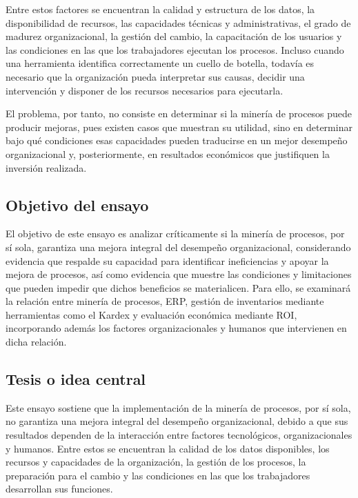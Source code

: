 \documentclass{article}
\begin{document}
    Entre estos factores se encuentran la calidad y estructura de los datos, la disponibilidad de recursos, las capacidades técnicas y administrativas, el grado de madurez organizacional, la gestión del cambio, la capacitación de los usuarios y las condiciones en las que los trabajadores ejecutan los procesos. Incluso cuando una herramienta identifica correctamente un cuello de botella, todavía es necesario que la organización pueda interpretar sus causas, decidir una intervención y disponer de los recursos necesarios para ejecutarla.

    El problema, por tanto, no consiste en determinar si la minería de procesos puede producir mejoras, pues existen casos que muestran su utilidad, sino en determinar bajo qué condiciones esas capacidades pueden traducirse en un mejor desempeño organizacional y, posteriormente, en resultados económicos que justifiquen la inversión realizada.

    \subsection{Objetivo del ensayo}

    El objetivo de este ensayo es analizar críticamente si la minería de procesos, por sí sola, garantiza una mejora integral del desempeño organizacional, considerando evidencia que respalde su capacidad para identificar ineficiencias y apoyar la mejora de procesos, así como evidencia que muestre las condiciones y limitaciones que pueden impedir que dichos beneficios se materialicen. Para ello, se examinará la relación entre minería de procesos, ERP, gestión de inventarios mediante herramientas como el Kardex y evaluación económica mediante ROI, incorporando además los factores organizacionales y humanos que intervienen en dicha relación.

    \subsection{Tesis o idea central}

    Este ensayo sostiene que la implementación de la minería de procesos, por sí sola, no garantiza una mejora integral del desempeño organizacional, debido a que sus resultados dependen de la interacción entre factores tecnológicos, organizacionales y humanos. Entre estos se encuentran la calidad de los datos disponibles, los recursos y capacidades de la organización, la gestión de los procesos, la preparación para el cambio y las condiciones en las que los trabajadores desarrollan sus funciones.
\end{document}
